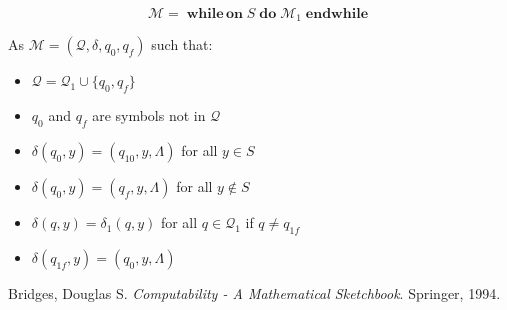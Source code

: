 \documentclass{article}
\newcommand{\M}{\mathcal{M}}
\newcommand{\Q}{\mathcal{Q}}
\DeclareMathOperator{\Nwhileon}{\mathbf{while\,on}}
\DeclareMathOperator{\Ndo}{\mathbf{do}}
\DeclareMathOperator{\Nendwhile}{\mathbf{endwhile}}
\begin{document}
	\[ \M = \Nwhileon S \Ndo \M_1 \Nendwhile \]
	
	As $\M = (\Q, \delta, q_0, q_f)$ such that:
	
	\begin{itemize}
	\item $\Q = \Q_1 \cup \{q_0, q_f\}$
	
	\item $q_0$ and $q_f$ are symbols not in $\Q$
	
	\item $\delta(q_0, y) = (q_{10}, y, \Lambda)$ for all $y \in S$
	
	\item $\delta(q_0, y) = (q_f, y, \Lambda)$ for all $y \not\in S$
	
	\item $\delta(q, y) = \delta_1(q, y)$ for all $q \in \Q_1$ if $q \neq q_{1f}$
	
	\item $\delta(q_{1f}, y) = (q_0, y, \Lambda)$
	\end{itemize}
	
	
	
\begin{thebibliography}{9}
Bridges, Douglas S.
\textit{Computability - A Mathematical Sketchbook}. 
Springer, 1994. %
\end{thebibliography}	
\end{document}
